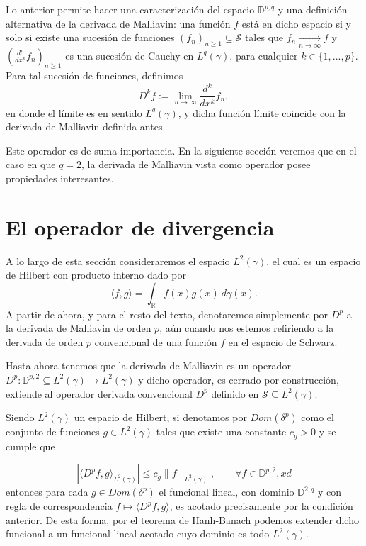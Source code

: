 \documentclass[letterpaper,twoside,12pt]{book}
\newcommand{\R}{\mathbb{R}}
\newcommand{\D}{\mathbb{D}}
\renewcommand{\S}{\mathcal{S}}
\newcommand{\1}{\mathds{1}}
\newcommand{\abs}[1]{\left\lvert #1 \right\rvert}
\renewcommand{\to}{\rightarrow}
\theoremstyle{definition}
\theoremstyle{definition}
\theoremstyle{definition}
\theoremstyle{definition}
\theoremstyle{definition}
\theoremstyle{definition}
\theoremstyle{definition}
\begin{document}
Lo anterior permite hacer una caracterización del espacio $\D^{p,q}$ y una definición alternativa de la derivada de Malliavin: una función $f$ está en dicho espacio si y solo si existe una sucesión de funciones $(f_n)_{n\geq1}\subseteq \S$ tales que $f_n\xrightarrow[n\to\infty]{}f$ y $(\frac{d^{p}}{dx^{p}}f_n)_{n\geq1}$ es una sucesión de Cauchy en $L^q(\gamma)$, para cualquier $k\in \{1,...,p\}$. Para tal sucesión de funciones, definimos 
\[
D^{k}f:=\lim_{n\to \infty}\frac{d^k}{dx^{k}}f_n,
\]
en donde el límite es en sentido $L^{q}(\gamma)$, y dicha función límite coincide con la derivada de Malliavin definida antes.

Este operador es de suma importancia. En la siguiente sección veremos que en el caso en que $q=2$, la derivada de Malliavin vista como operador posee propiedades interesantes.

\section{El operador de divergencia}

A lo largo de esta sección consideraremos el espacio $L^2(\gamma)$, el cual es un espacio de Hilbert con producto interno dado por 
\[
\langle f,g\rangle=\int_\R f(x)g(x)\ d\gamma(x).
\]
A partir de ahora, y para el resto del texto, denotaremos simplemente por $D^{p}$ a la derivada de Malliavin de orden $p$, aún cuando nos estemos refiriendo a la derivada de orden $p$ convencional de una función $f$ en el espacio de Schwarz.

Hasta ahora tenemos que la derivada de Malliavin es un operador $D^{p}:\mathbb{D}^{p,2}\subseteq L^2(\gamma)\longrightarrow L^2(\gamma)$ y dicho operador, es cerrado por construcción, extiende al operador derivada convencional $D^{p}$ definido en $\mathcal{S}\subseteq L^2(\gamma)$. 

Siendo $L^{2}(\gamma)$ un espacio de Hilbert, si denotamos por $Dom(\delta^{p})$ como el conjunto de funciones $g\in L^{2}(\gamma)$ tales que existe una constante $c_g>0$ y se cumple que

\[
\abs{\langle D^{p}f,g\rangle_{L^2(\gamma)}}\leq c_g\|f\|_{L^2(\gamma)}, \qquad \forall f\in \mathbb{D}^{p,2},                 xd
\]
entonces para cada $g\in Dom(\delta^{p})$ el funcional lineal, con dominio $\D^{2,q}$ y con regla de correspondencia $f\longmapsto \langle D^{p}f,g\rangle$, es acotado precisamente por la condición anterior. De esta forma, por el teorema de Hanh-Banach podemos extender dicho funcional a un funcional lineal acotado cuyo dominio es todo $L^2(\gamma)$.
\end{document}

